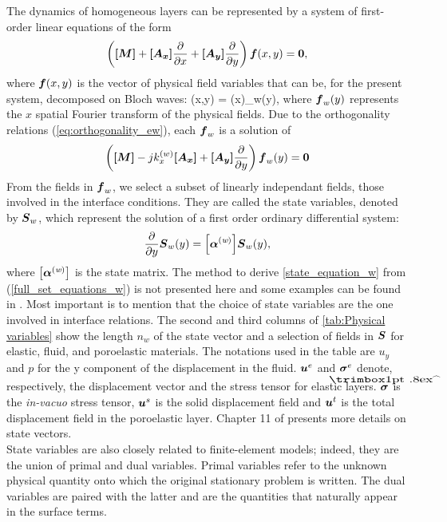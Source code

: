 The dynamics of homogeneous layers can be represented by a system of first-order linear equations of the form
\begin{equation}
\left( \boldsymbol{\left[M\right]}+\boldsymbol{\left[A_x\right]}\dfrac{\partial}{\partial x}+\boldsymbol{\left[A_y\right]}\dfrac{\partial}{\partial y}
\right) \boldsymbol{f}(x,y)=\boldsymbol{0},
\end{equation}
where $\boldsymbol{f}(x,y)$ is the vector of physical field variables that can be, for the present system, decomposed on Bloch waves:
\be 
{}(x,y) = \sumN \ew(x)_{w}(y), 
\ee 
where $\boldsymbol{f}_{w}(y)$ represents the $x$ spatial Fourier transform of the physical fields. Due to the orthogonality relations (\ref{eq:orthogonality_ew}), each $\boldsymbol{f}_{w}$ is a solution of  
\begin{equation}\label{full_set_equations_w}
\left( \boldsymbol{\left[M\right]}-jk_x^{(w)}\boldsymbol{\left[A_x\right]}+\boldsymbol{\left[A_y\right]}\dfrac{\partial}{\partial y}
\right) \boldsymbol{f}_{w}(y)=\boldsymbol{0}
\end{equation}
From the fields in $\boldsymbol{f}_w$, we select a subset of linearly independant fields, those involved in the interface conditions. They are called the state variables, denoted by $\boldsymbol{S}_w$, which represent the solution of a first order ordinary differential system: 
\begin{equation}\label{state_equation_w}
\frac{\partial}{\partial y}\boldsymbol{S}_{w}(y) = \boldsymbol{\left[\alpha^{\textrm{(}\textit{w}\textrm{)}}\right]}\boldsymbol{S}_{w}(y),
\end{equation}
where $\boldsymbol{\left[\alpha^{\textrm{(}\textit{w}\textrm{)}}\right]}$ is the state matrix. The method to derive \cref{state_equation_w} from (\ref{full_set_equations_w}) is not presented here and some examples can be found in \cite{gautier2011,parramartinezDerivationStateMatrix2016}. Most important is to mention that the choice of state variables are the one involved in interface relations. The second and third columns of \cref{tab:Physical variables} show the length $n_w$ of the state vector and a selection of fields in $\boldsymbol{S}$ for elastic, fluid, and poroelastic materials. The notations used in the table are $u_y$ and $p$ for the y component of the displacement in the fluid. $\boldsymbol u^e$ and $\boldsymbol \sigma^e$ denote, respectively, the displacement vector and the stress tensor for elastic layers. $\bs{\hat \sigma}$ is the \emph{in-vacuo} stress tensor, $\boldsymbol u^s$ is the solid displacement field and $\boldsymbol u^t$ is the total displacement field in the poroelastic layer. Chapter 11 of \cite{allard2009} presents more details on state vectors.\\

State variables are also closely related to finite-element models; indeed, they are the union of primal and dual variables. Primal variables refer to the unknown physical quantity onto which the original stationary problem is written. The dual variables are paired with the latter and are the quantities that naturally appear in the surface terms.  

